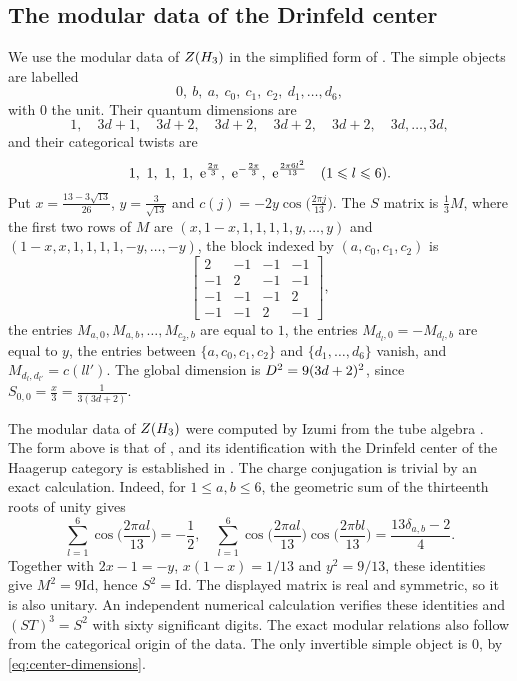 \documentclass[leqno]{article}
\let\cal\relax
\newcommand{\cal}{\mathcal}
\newcommand{\Id}{\mathrm{Id}}
\renewcommand{\leq}{\ensuremath{\leqslant}}
\let\i\relax
\newcommand{\i}{\mathrm{i}}
\newcommand{\e}{\mathrm{e}}
\numberwithin{equation}{section}
\begin{document}
\subsection{The modular data of the Drinfeld center}

We use the modular data of $Z(\cal H_3)$ in the simplified form of \cite[equations (2.5a) and (2.5b) p.~20]{EvG11}. The simple objects are labelled
\[
0,\ b,\ a,\ c_0,\ c_1,\ c_2,\ d_1,\ldots,d_6,
\]
with $0$ the unit. Their quantum dimensions are
\begin{equation}
\label{eq:center-dimensions}
1,\quad 3d+1,\quad 3d+2,\quad 3d+2,\quad 3d+2,\quad 3d+2,\quad 3d,\ldots,3d,
\end{equation}
and their categorical twists are
\begin{equation}
\label{eq:center-twists}
1,\ 1,\ 1,\ 1,\ \e^{\frac{2\pi\i}{3}},\ \e^{-\frac{2\pi\i}{3}},\ \e^{\frac{2\pi\i 6l^2}{13}}\quad (1 \leq l \leq 6).
\end{equation}
Put $x = \frac{13-3\sqrt{13}}{26}$, $y = \frac{3}{\sqrt{13}}$ and $c(j) = -2y\cos\big(\frac{2\pi j}{13}\big)$. The $S$ matrix is $\frac{1}{3}M$, where the first two rows of $M$ are $(x,1-x,1,1,1,1,y,\ldots,y)$ and $(1-x,x,1,1,1,1,-y,\ldots,-y)$, the block indexed by $(a,c_0,c_1,c_2)$ is
\[
\begin{bmatrix}
2&-1&-1&-1\\
-1&2&-1&-1\\
-1&-1&-1&2\\
-1&-1&2&-1
\end{bmatrix},
\]
the entries $M_{a,0}, M_{a,b}, \ldots, M_{c_2,b}$ are equal to $1$, the entries $M_{d_l,0} = -M_{d_l,b}$ are equal to $y$, the entries between $\{a,c_0,c_1,c_2\}$ and $\{d_1,\ldots,d_6\}$ vanish, and $M_{d_l,d_{l'}} = c(ll')$. The global dimension is $\cal D^2 = 9(3d+2)^2$, since $S_{0,0} = \frac{x}{3} = \frac{1}{3(3d+2)}$.

The modular data of $Z(\cal H_3)$ were computed by Izumi from the tube algebra \cite{Izu01}. The form above is that of \cite{EvG11}, and its identification with the Drinfeld center of the Haagerup category is established in \cite{GSY26}. The charge conjugation is trivial by an exact calculation. Indeed, for $1 \leq a,b \leq 6$, the geometric sum of the thirteenth roots of unity gives
\[
\sum_{l = 1}^6 \cos\Big(\frac{2\pi al}{13}\Big) = -\frac12,\quad
\sum_{l = 1}^6 \cos\Big(\frac{2\pi al}{13}\Big)\cos\Big(\frac{2\pi bl}{13}\Big)
= \frac{13\delta_{a,b}-2}{4}.
\]
Together with $2x-1 = -y$, $x(1-x) = 1/13$ and $y^2 = 9/13$, these identities give $M^2 = 9\Id$, hence $S^2 = \Id$. The displayed matrix is real and symmetric, so it is also unitary. An independent numerical calculation verifies these identities and $(ST)^3 = S^2$ with sixty significant digits. The exact modular relations also follow from the categorical origin of the data. The only invertible simple object is $0$, by \eqref{eq:center-dimensions}.
\end{document}
